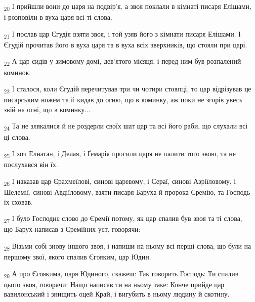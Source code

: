 \begin{tcolorbox}
\textsubscript{20} І прийшли вони до царя на подвір'я, а звоя поклали в кімнаті писаря Елішами, і розповіли в вуха царя всі ті слова.
\end{tcolorbox}
\begin{tcolorbox}
\textsubscript{21} І послав цар Єгудія взяти звоя, і той узяв його з кімнати писаря Елішами. І Єгудій прочитав його в вуха царя та в вуха всіх зверхників, що стояли при царі.
\end{tcolorbox}
\begin{tcolorbox}
\textsubscript{22} А цар сидів у зимовому домі, дев'ятого місяця, і перед ним був розпалений коминок.
\end{tcolorbox}
\begin{tcolorbox}
\textsubscript{23} І сталося, коли Єгудій перечитував три чи чотири стовпці, то цар відрізував це писарським ножем та й кидав до огню, що в коминку, аж поки не згорів увесь звій на огні, що в коминку...
\end{tcolorbox}
\begin{tcolorbox}
\textsubscript{24} Та не злякалися й не роздерли своїх шат цар та всі його раби, що слухали всі ці слова.
\end{tcolorbox}
\begin{tcolorbox}
\textsubscript{25} І хоч Елнатан, і Делая, і Ґемарія просили царя не палити того звою, та не послухався він їх.
\end{tcolorbox}
\begin{tcolorbox}
\textsubscript{26} І наказав цар Єрахмеїлові, синові царевому, і Сераї, синові Азріїловому, і Шелемії, синові Авдіїловому, взяти писаря Баруха й пророка Єремію, та Господь їх сховав.
\end{tcolorbox}
\begin{tcolorbox}
\textsubscript{27} І було Господнє слово до Єремії потому, як цар спалив був звоя та ті слова, що Барух написав з Єреміїних уст, говорячи:
\end{tcolorbox}
\begin{tcolorbox}
\textsubscript{28} Візьми собі знову іншого звоя, і напиши на ньому всі перші слова, що були на першому звої, якого спалив Єгояким, цар Юдин.
\end{tcolorbox}
\begin{tcolorbox}
\textsubscript{29} А про Єгоякима, царя Юдиного, скажеш: Так говорить Господь: Ти спалив цього звоя, говорячи: Нащо написав ти на ньому таке: Конче прийде цар вавилонський і знищить оцей Край, і вигубить в ньому людину й скотину.
\end{tcolorbox}
